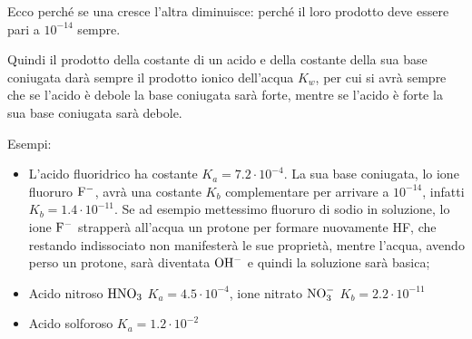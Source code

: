 Ecco perché se una cresce l'altra diminuisce: perché il loro prodotto deve essere pari a $10^{-14}$ sempre.

Quindi il prodotto della costante di un acido e della costante della sua base coniugata darà sempre il prodotto ionico dell'acqua $K_w$, per cui si avrà sempre che se l'acido è debole la base coniugata sarà forte, mentre se l'acido è forte la sua base coniugata sarà debole.

\vspace{0.2cm}Esempi:
\begin{itemize}
    \item L'acido fluoridrico ha costante $K_a=7.2 \cdot 10^{-4}$. La sua base coniugata, lo ione fluoruro $\rm F^-$, avrà una costante $K_b$ complementare per arrivare a $10^{-14}$, infatti $K_b=1.4\cdot10^{-11}$. Se ad esempio mettessimo fluoruro di sodio in soluzione, lo ione $\rm F^-$ strapperà all'acqua un protone per formare nuovamente HF, che restando indissociato non manifesterà le sue proprietà, mentre l'acqua, avendo perso un protone, sarà diventata $\rm OH^-$ e quindi la soluzione sarà basica;
    \item Acido nitroso $\rm HNO_3$ $K_a=4.5 \cdot 10^{-4}$, ione nitrato $\rm NO_3^-$ $K_b=2.2 \cdot 10^{-11}$
    \item Acido solforoso $K_a=1.2 \cdot 10^{-2}$
\end{itemize}

